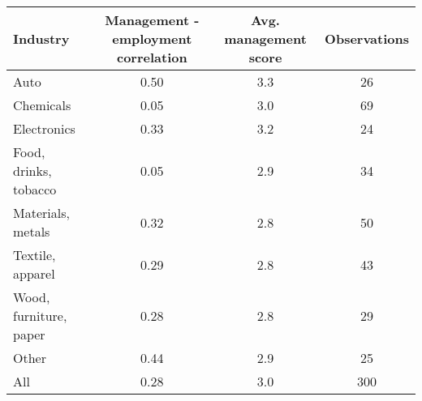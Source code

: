 \begin{table}[ht]
\centering
\begin{tabular}{lccc}
  \hline
Industry & Management - employment correlation & Avg. management score & Observations \\ 
  \hline
Auto & 0.50 & 3.3 & 26 \\ 
  Chemicals & 0.05 & 3.0 & 69 \\ 
  Electronics & 0.33 & 3.2 & 24 \\ 
  Food, drinks, tobacco & 0.05 & 2.9 & 34 \\ 
  Materials, metals & 0.32 & 2.8 & 50 \\ 
  Textile, apparel & 0.29 & 2.8 & 43 \\ 
  Wood, furniture, paper & 0.28 & 2.8 & 29 \\ 
  Other & 0.44 & 2.9 & 25 \\ 
  All & 0.28 & 3.0 & 300 \\ 
   \hline
\end{tabular}
\end{table}
